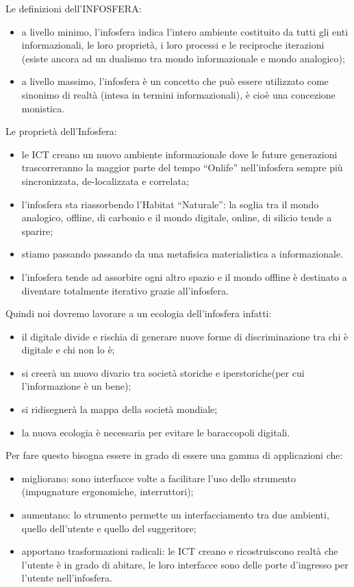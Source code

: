 \documentclass[a4page, 11pt]{article}
\begin{document}
Le definizioni dell'INFOSFERA:
\begin{itemize}
  \item a livello minimo, l'infosfera indica l'intero ambiente costituito da tutti gli enti informazionali, le loro proprietà, i loro processi e le reciproche iterazioni (esiste ancora ad un dualismo tra mondo informazionale e mondo analogico);
  \item a livello massimo, l'infosfera è un concetto che può essere utilizzato come sinonimo di realtà (intesa in termini informazionali), è cioè una concezione monistica.
\end{itemize}
Le proprietà dell'Infosfera:
\begin{itemize}
  \item le ICT creano un nuovo ambiente informazionale dove le future generazioni trascorreranno la maggior parte del tempo ``Onlife'' nell'infosfera sempre più sincronizzata, de-localizzata e correlata;
  \item l'infosfera sta riassorbendo l'Habitat ``Naturale'': la soglia tra il mondo analogico, offline, di carbonio e il mondo digitale, online, di silicio tende a sparire;
  \item stiamo passando passando da una metafisica materialistica a informazionale.
  \item l'infosfera tende ad assorbire ogni altro spazio e il mondo offline è destinato a diventare totalmente iterativo grazie all'infosfera.
\end{itemize}
Quindi noi dovremo lavorare a un ecologia dell'infosfera infatti:
\begin{itemize}
  \item il digitale divide e rischia di generare nuove forme di discriminazione tra chi è digitale e chi non lo è;
  \item si creerà un nuovo divario tra società storiche e iperstoriche(per cui l'informazione è un bene);
  \item si ridisegnerà la mappa della società mondiale;
  \item la nuova ecologia è necessaria per evitare le baraccopoli digitali.
\end{itemize}

Per fare questo bisogna essere in grado di essere una gamma di applicazioni che:
\begin{itemize}
  \item migliorano: sono interfacce volte a facilitare l'uso dello strumento (impugnature ergonomiche, interruttori);
  \item aumentano: lo strumento permette un interfacciamento tra due ambienti, quello dell'utente e quello del suggeritore;
  \item apportano trasformazioni radicali: le ICT creano e ricostruiscono realtà che l'utente è in grado di abitare, le loro interfacce sono delle porte d'ingresso per l'utente nell'infosfera.
\end{itemize}
\end{document}

